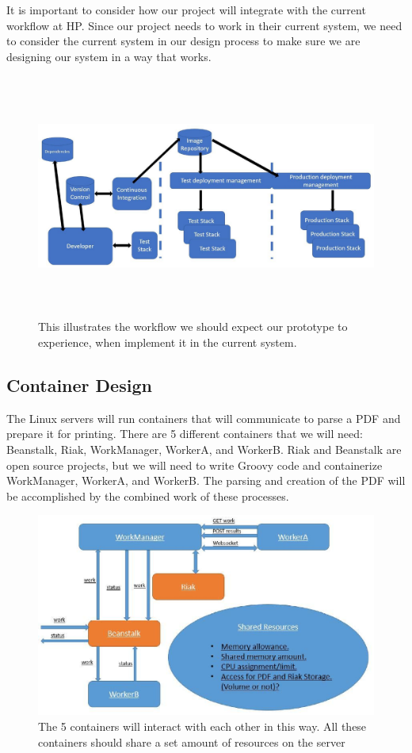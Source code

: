 \documentclass[onecolumn, draftclsnofoot,10pt, compsoc]{IEEEtran}
\begin{document}
It is important to consider how our project will integrate with the current workflow at HP. Since our project needs to work in their current system, we need to consider the current system in our design process to make sure we are designing our system in a way that works.

\begin{figure}[h]
    \centering
    \includegraphics[width=\textwidth, height=8cm]{prjct_arch.eps}
    \caption{This illustrates the workflow we should expect our prototype to experience, when implement it in the current system.}
\end{figure}

\subsection{Container Design}

The Linux servers will run containers that will communicate to parse a PDF and prepare it for printing. There are 5 different containers that we will need: Beanstalk, Riak, WorkManager, WorkerA, and WorkerB. Riak and Beanstalk are open source projects, but we will need to write Groovy code and containerize WorkManager, WorkerA, and WorkerB. The parsing and creation of the PDF will be accomplished by the combined work of these processes. 
\newpage

\begin{figure}[h]
    \centering
    \includegraphics{prjct_arch_workers.eps}
    \caption{The 5 containers will interact with each other in this way. All these containers should share a set amount of resources on the server}
\end{figure}
\end{document}
